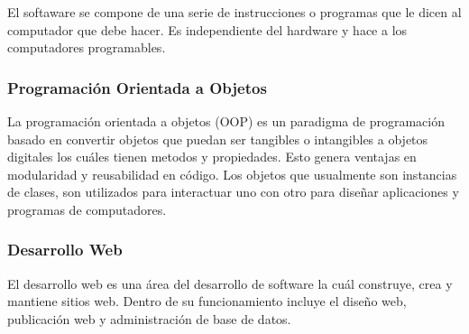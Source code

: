 El softaware se compone de una serie de instrucciones o programas que le dicen al computador que debe hacer. Es independiente del hardware y hace a los computadores programables.  \cite{A31}

\subsubsection{Programación Orientada a Objetos}

La programación orientada a objetos (OOP) es un paradigma de programación  basado en convertir objetos que puedan ser tangibles o intangibles a objetos digitales los cuáles tienen metodos y propiedades. Esto genera ventajas en modularidad y reusabilidad en código. Los objetos que usualmente son instancias de clases, son utilizados para interactuar uno con otro para diseñar aplicaciones y programas de computadores. \cite{A32}

\subsubsection{Desarrollo Web}

El desarrollo web es una área del desarrollo de software la cuál construye, crea y mantiene sitios web. Dentro de su funcionamiento incluye el diseño web, publicación web y administración de base de datos. \cite{A33}